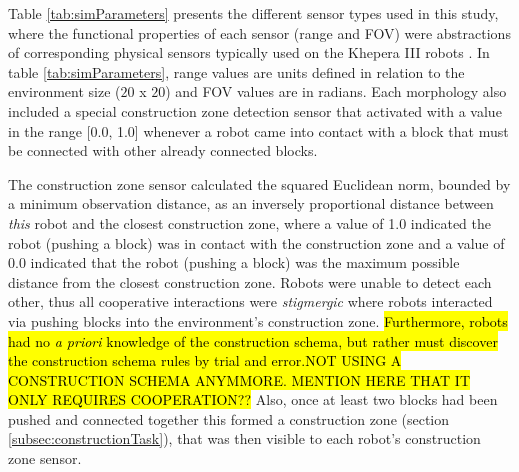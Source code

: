 Table \ref{tab:simParameters} presents the different sensor types used in this study, where the functional properties of each sensor
(range and FOV) were abstractions of corresponding physical sensors typically used on the Khepera III robots \cite{khepera3usermanual2013}.
In table \ref{tab:simParameters}, range values are units defined in relation to the environment size ($20$ x $20$)
and FOV values are in radians.
Each morphology also included a special construction zone detection sensor that activated with a value in the range
[0.0, 1.0] whenever a robot came into
contact with a block that must be connected with other already connected blocks.

The construction zone sensor calculated the squared Euclidean norm, bounded by a minimum observation distance, as an
inversely proportional distance between \textit{this} robot and the closest construction zone, where a value of 1.0 indicated the robot (pushing a block)
was in contact with the construction zone and a value of 0.0 indicated that the robot (pushing a block) was the maximum possible
distance from the closest construction zone.
Robots were unable to detect each other, thus all cooperative interactions were \textit{stigmergic} \cite{BeckersHollandDeneubourg1994}
where robots interacted via pushing blocks into the environment's construction zone.
\hl{Furthermore, robots had no \textit{a priori} knowledge of the construction schema,
but rather must discover the construction schema rules by trial and error.NOT USING A CONSTRUCTION SCHEMA ANYMMORE. MENTION HERE THAT IT ONLY REQUIRES COOPERATION??}
Also, once at least two blocks had been pushed and connected together this formed a construction zone (section \ref{subsec:constructionTask}),
that was then visible to each robot's construction zone sensor.

